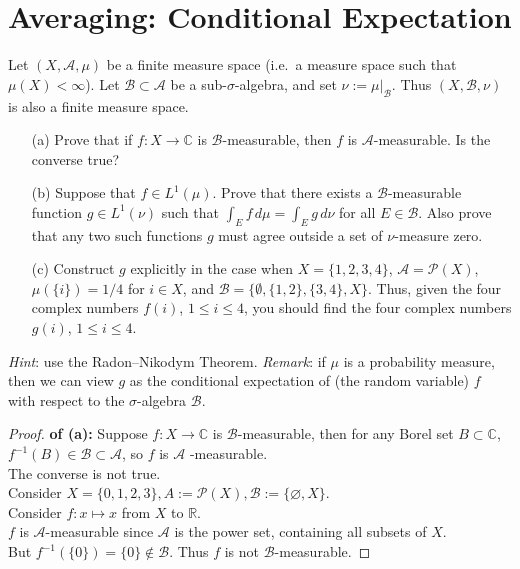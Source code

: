 \documentclass[lang=cn,11pt]{elegantbook}
\begin{document}
\section{Averaging: Conditional Expectation}
  Let $(X,\mathcal{A},\mu)$ be a finite measure space (i.e.\ a measure space such that $\mu(X)<\infty$). Let $\mathcal{B}\subset\mathcal{A}$ be a sub-$\sigma$-algebra, and set $\nu:=\mu|_\mathcal{B}$. Thus $(X,\mathcal{B},\nu)$ is also a finite measure space. 
  \begin{itemize}
  \item[(a)]   Prove that if $f\colon X\to\mathbb{C}$ is $\mathcal{B}$-measurable, then $f$ is $\mathcal{A}$-measurable. Is the converse true? 
  \item[(b)]    Suppose that $f\in L^1(\mu)$. Prove that there exists a $\mathcal{B}$-measurable function $g\in L^1(\nu)$ such that $\int_Ef\,d\mu=\int_Eg\,d\nu$ for all $E\in\mathcal{B}$. Also prove that any two such functions $g$ must agree outside a set of $\nu$-measure zero. 
  \item[(c)]Construct $g$ explicitly in the case when $X=\{1,2,3,4\}$, $\mathcal{A}=\mathcal{P}(X)$, $\mu(\{i\})=1/4$ for $i\in X$, and $\mathcal{B}=\{\emptyset,\{1,2\},\{3,4\},X\}$. 
    Thus, given the four complex numbers $f(i)$, $1\le i\le 4$, you should find the four complex numbers $g(i)$, $1\le i\le 4$. 
  \end{itemize}
 \textit{Hint}: use the Radon--Nikodym Theorem. 
 \textit{Remark}: if $\mu$ is a probability measure, then we can view $g$ as the conditional expectation of (the random variable) $f$ with respect to the $\sigma$-algebra $\mathcal{B}$. 


\begin{proof}
    \textbf{of (a):}
Suppose $f: X \rightarrow \mathbb{C}$ is $\mathcal{B}$-measurable, then for any Borel set $B \subset \mathbb{C}$, $f^{-1}(B) \in \mathcal{B} \subset \mathcal{A}$, so $f$ is $\mathcal{A}$ -measurable.\\
The converse is not true.\\
Consider $X = \{ 0,1,2,3 \}, A:= \mathcal{P}(X), \mathcal{B}:= \{\varnothing,X\}$.\\
Consider $f:x\mapsto x$ from $X$ to $\mathbb{R}$.\\
$f$ is $\mathcal{A}$-measurable since $\mathcal{A}$ is the power set, containing all subsets of $X$.\\
But $f^{-1}(\{0\}) = \{0\} \not \in \mathcal{B}$. Thus $f$ is not $\mathcal{B}$-measurable.
\end{proof}
\end{document}
